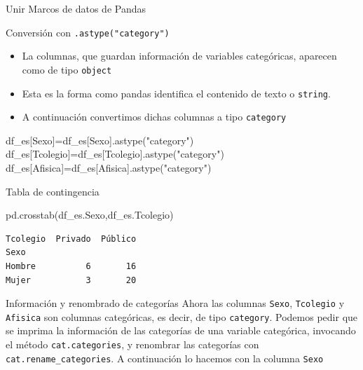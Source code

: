 \documentclass[
  ignorenonframetext,
  aspectratio=169,
  spanish,
]{beamer}
\newenvironment{Shaded}{\begin{snugshade}}{\end{snugshade}}
\newcommand{\NormalTok}[1]{\textcolor[rgb]{0.00,0.23,0.31}{#1}}
\newcommand{\OperatorTok}[1]{\textcolor[rgb]{0.37,0.37,0.37}{#1}}
\newcommand{\StringTok}[1]{\textcolor[rgb]{0.13,0.47,0.30}{#1}}
\begin{document}
\begin{frame}[fragile]{Unir Marcos de datos de Pandas}
\begin{block}{Conversión con \texttt{.astype("category")}}
\label{conversiuxf3n-con-.astypecategory}
\begin{itemize}
\item
  La columnas, que guardan información de variables categóricas,
  aparecen como de tipo \texttt{object}
\item
  Esta es la forma como pandas identifica el contenido de texto o
  \texttt{string}.
\item
  A continuación convertimos dichas columnas a tipo \texttt{category}
\end{itemize}

\begin{Shaded}
\begin{Highlighting}[]
\NormalTok{df\_es[}\StringTok{\textquotesingle{}Sexo\textquotesingle{}}\NormalTok{]}\OperatorTok{=}\NormalTok{df\_es[}\StringTok{\textquotesingle{}Sexo\textquotesingle{}}\NormalTok{].astype(}\StringTok{"category"}\NormalTok{)}
\NormalTok{df\_es[}\StringTok{\textquotesingle{}Tcolegio\textquotesingle{}}\NormalTok{]}\OperatorTok{=}\NormalTok{df\_es[}\StringTok{\textquotesingle{}Tcolegio\textquotesingle{}}\NormalTok{].astype(}\StringTok{"category"}\NormalTok{)}
\NormalTok{df\_es[}\StringTok{\textquotesingle{}Afisica\textquotesingle{}}\NormalTok{]}\OperatorTok{=}\NormalTok{df\_es[}\StringTok{\textquotesingle{}Afisica\textquotesingle{}}\NormalTok{].astype(}\StringTok{"category"}\NormalTok{)}
\end{Highlighting}
\end{Shaded}
\end{block}

\begin{block}{Tabla de contingencia}
\label{tabla-de-contingencia}
\begin{Shaded}
\begin{Highlighting}[]
\NormalTok{pd.crosstab(df\_es.Sexo,df\_es.Tcolegio) }
\end{Highlighting}
\end{Shaded}

\begin{verbatim}
Tcolegio  Privado  Público
Sexo                      
Hombre          6       16
Mujer           3       20
\end{verbatim}
\end{block}

\begin{block}{Información y renombrado de categorías}
\label{informaciuxf3n-y-renombrado-de-categoruxedas}
Ahora las columnas \texttt{Sexo}, \texttt{Tcolegio} y \texttt{Afisica}
son columnas categóricas, es decir, de tipo \texttt{category}. Podemos
pedir que se imprima la información de las categorías de una variable
categórica, invocando el método \texttt{cat.categories}, y renombrar las
categorías con \texttt{cat.rename\_categories}. A continuación lo
hacemos con la columna \texttt{Sexo}
\end{block}


\end{frame}
\end{document}
